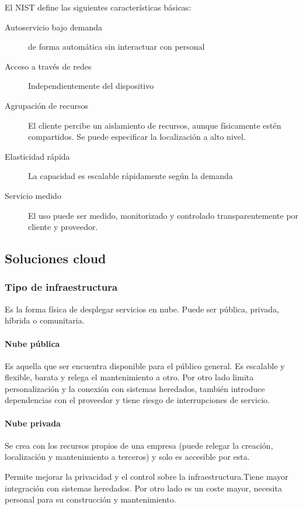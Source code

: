     El NIST define las siguientes características básicas:

    \begin{description}
        \item[Autoservicio bajo demanda] de forma automática sin interactuar con personal
        \item[Acceso a través de redes] Independientemente del dispositivo
        \item[Agrupación de recursos] El cliente percibe un aislamiento de recursos, aunque físicamente estén compartidos. Se puede especificar la localización a alto nivel.
        \item[Elasticidad rápida] La capacidad es escalable rápidamente según la demanda
        \item[Servicio medido] El uso puede ser medido, monitorizado y controlado transparentemente por cliente y proveedor.
    \end{description}

\subsection{Soluciones cloud}

    \subsubsection{Tipo de infraestructura}
    Es la forma física de desplegar servicios en nube. Puede ser pública, privada, híbrida o comunitaria.

    \paragraph{Nube pública}
        Es aquella que ser encuentra disponible para el público general. Es escalable y flexible, barata y relega el mantenimiento a otro. Por otro lado limita personalización y la conexión con sistemas heredados, también introduce dependencias con el proveedor y tiene riesgo de interrupciones de servicio.

    \paragraph{Nube privada}
        Se crea con los recursos propios de una empresa (puede relegar la creación, localización y mantenimiento a terceros) y solo es accesible por esta. 

        Permite mejorar la privacidad y el control sobre la infraestructura.Tiene mayor integración con sistemas heredados. Por otro lado es un coste mayor, necesita personal para su construcción y mantenimiento.

